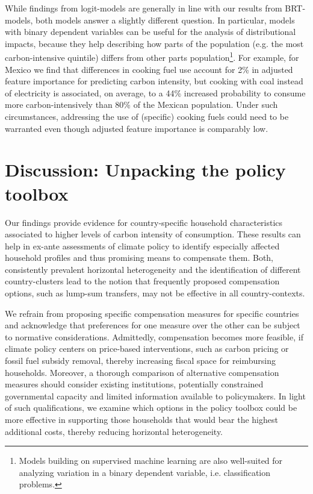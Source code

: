 \documentclass[12pt, a4paper]{article}
\begin{document}
While findings from logit-models are generally in line with our results from BRT-models, both models answer a slightly different question. In particular, models with binary dependent variables can be useful for the analysis of distributional impacts, because they help describing how parts of the population (e.g. the most carbon-intensive quintile) differs from other parts population\footnote{Models building on supervised machine learning are also well-suited for analyzing variation in a binary dependent variable, i.e. classification problems.}. For example, for Mexico we find that differences in cooking fuel use account for 2\% in adjusted feature importance for predicting carbon intensity, but cooking with coal instead of electricity is associated, on average, to a 44\% increased probability to consume more carbon-intensively than 80\% of the Mexican population. Under such circumstances, addressing the use of (specific) cooking fuels could need to be warranted even though adjusted feature importance is comparably low.

\section{Discussion: Unpacking the policy toolbox} \label{sec:discussion}

Our findings provide evidence for country-specific household characteristics associated to higher levels of carbon intensity of consumption. These results can help in ex-ante assessments of climate policy to identify especially affected household profiles and thus promising means to compensate them. Both, consistently prevalent horizontal heterogeneity and the identification of different country-clusters lead to the notion that frequently proposed compensation options, such as lump-sum transfers, may not be effective in all country-contexts.

We refrain from proposing specific compensation measures for specific countries and acknowledge that preferences for one measure over the other can be subject to normative considerations. Admittedly, compensation becomes more feasible, if climate policy centers on price-based interventions, such as carbon pricing or fossil fuel subsidy removal, thereby increasing fiscal space for reimbursing households. Moreover, a thorough comparison of alternative compensation measures should consider existing institutions, potentially constrained governmental capacity and limited information available to policymakers. In light of such qualifications, we examine which options in the policy toolbox could be more effective in supporting those households that would bear the highest additional costs, thereby reducing horizontal heterogeneity.
\end{document}
